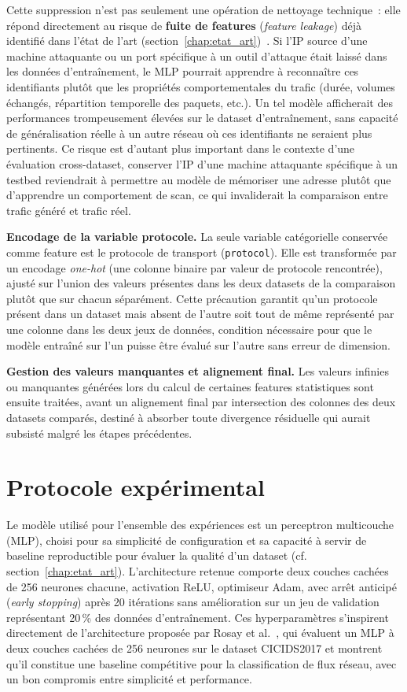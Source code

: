 \documentclass[12pt, a4paper]{report}
\begin{document}
Cette suppression n'est pas seulement une opération de nettoyage
technique~: elle répond directement au risque de \textbf{fuite de
features} (\textit{feature leakage}) déjà identifié dans l'état de
l'art (section~\ref{chap:etat_art})~\cite{flood2024}. Si l'IP source
d'une machine attaquante ou un port spécifique à un outil d'attaque
était laissé dans les données d'entraînement, le MLP pourrait apprendre
à reconnaître ces identifiants plutôt que les propriétés comportementales
du trafic (durée, volumes échangés, répartition temporelle des paquets,
etc.). Un tel modèle afficherait des performances trompeusement élevées
sur le dataset d'entraînement, sans capacité de généralisation réelle
à un autre réseau où ces identifiants ne seraient plus pertinents. Ce
risque est d'autant plus important dans le contexte d'une évaluation
cross-dataset, conserver l'IP d'une machine attaquante spécifique à
un testbed reviendrait à permettre au modèle de mémoriser une adresse
plutôt que d'apprendre un comportement de scan, ce qui invaliderait
la comparaison entre trafic généré et trafic réel.

\textbf{Encodage de la variable protocole.} La seule variable
catégorielle conservée comme feature est le protocole de transport
(\texttt{protocol}). Elle est transformée par un encodage \textit{one-hot}
(une colonne binaire par valeur de protocole rencontrée), ajusté sur
l'union des valeurs présentes dans les deux datasets de la comparaison
plutôt que sur chacun séparément. Cette précaution garantit qu'un
protocole présent dans un dataset mais absent de l'autre soit tout de
même représenté par une colonne dans les deux jeux de données, condition
nécessaire pour que le modèle entraîné sur l'un puisse être évalué sur
l'autre sans erreur de dimension.

\textbf{Gestion des valeurs manquantes et alignement final.} Les valeurs
infinies ou manquantes générées lors du calcul de certaines features
statistiques sont ensuite traitées, avant un alignement final par
intersection des colonnes des deux datasets comparés, destiné à absorber
toute divergence résiduelle qui aurait subsisté malgré les étapes
précédentes.
 
\section{Protocole expérimental}
\label{sec:features_mlp}
 
Le modèle utilisé pour l'ensemble des expériences est un perceptron
multicouche (MLP), choisi pour sa simplicité de configuration et sa
capacité à servir de baseline reproductible pour évaluer la qualité
d'un dataset (cf. section~\ref{chap:etat_art}). L'architecture retenue
comporte deux couches cachées de 256 neurones chacune, activation ReLU,
optimiseur Adam, avec arrêt anticipé (\textit{early stopping}) après
20 itérations sans amélioration sur un jeu de validation représentant
20\,\% des données d'entraînement. Ces hyperparamètres s'inspirent
directement de l'architecture proposée par Rosay et
al.~\cite{rosay2020}, qui évaluent un MLP à deux couches cachées de
256 neurones sur le dataset CICIDS2017 et montrent qu'il constitue une
baseline compétitive pour la classification de flux réseau, avec un bon
compromis entre simplicité et performance.
 
\end{document}

